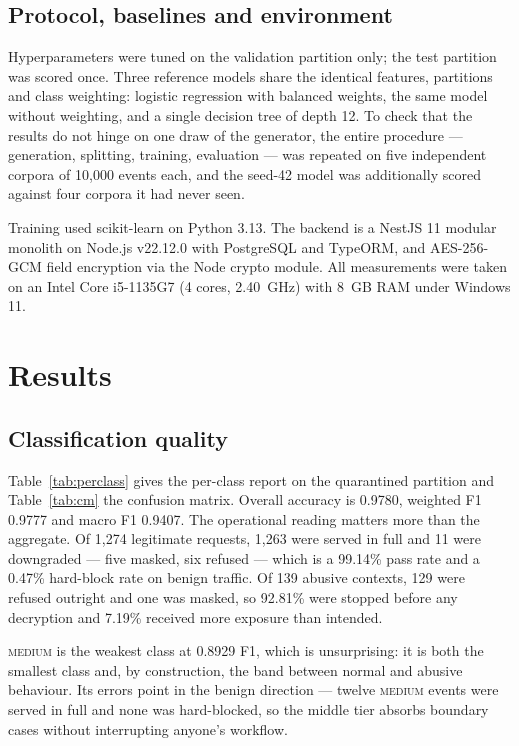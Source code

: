 \documentclass[a4paper,conference]{IEEEtran}
\newcommand{\MED}{\textsc{medium}}
\begin{document}
\subsection{Protocol, baselines and environment}

Hyperparameters were tuned on the validation partition only; the test partition was scored once.
Three reference models share the identical features, partitions and class weighting: logistic
regression with balanced weights, the same model without weighting, and a single decision tree of
depth 12. To check that the results do not hinge on one draw of the generator, the entire
procedure --- generation, splitting, training, evaluation --- was repeated on five independent
corpora of 10{,}000 events each, and the seed-42 model was additionally scored against four
corpora it had never seen.

Training used scikit-learn on Python 3.13. The backend is a NestJS 11 modular monolith on
Node.js v22.12.0 with PostgreSQL and TypeORM, and AES-256-GCM field encryption via the Node
crypto module. All measurements were taken on an Intel Core i5-1135G7 (4 cores, 2.40~GHz) with
8~GB RAM under Windows 11.

\section{Results}

\subsection{Classification quality}

Table~\ref{tab:perclass} gives the per-class report on the quarantined partition and
Table~\ref{tab:cm} the confusion matrix. Overall accuracy is 0.9780, weighted F1 0.9777 and
macro F1 0.9407. The operational reading matters more than the aggregate. Of 1{,}274 legitimate
requests, 1{,}263 were served in full and 11 were downgraded --- five masked, six refused ---
which is a 99.14\% pass rate and a 0.47\% hard-block rate on benign traffic. Of 139 abusive
contexts, 129 were refused outright and one was masked, so 92.81\% were stopped before any
decryption and 7.19\% received more exposure than intended.

\MED{} is the weakest class at 0.8929 F1, which is unsurprising: it is both the smallest class
and, by construction, the band between normal and abusive behaviour. Its errors point in the
benign direction --- twelve \MED{} events were served in full and none was hard-blocked, so the
middle tier absorbs boundary cases without interrupting anyone's workflow.
\end{document}

